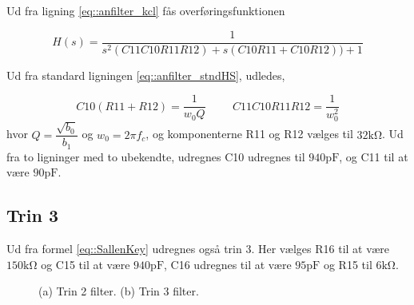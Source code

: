 Ud fra ligning \ref{eq::anfilter_kcl} fås overføringsfunktionen


\begin{equation}
H(s) = \dfrac{1}{s^2(C11C10R11R12)+s(C10R11+C10R12))+1}
\label{eq::SallenKey}
\end{equation}
 
Ud fra standard ligningen \ref{eq::anfilter_stndHS}, udledes,

\begin{equation}
	 C10(R11+R12) = \dfrac{1}{w_0 Q} \hspace{1cm} C11  C10  R11  R12 = \dfrac{1}{w_0^2} \nonumber
\end{equation}
hvor $Q = \dfrac{\sqrt{b_0}}{b_1}$ og $w_0 = 2\pi f_c$, og komponenterne R11 og R12 vælges til $32\si{\kilo\ohm}$. Ud fra to ligninger med to ubekendte, udregnes C10 udregnes til $940\si{\pico\farad}$, og C11 til at være $90 \si{\pico\farad}$.
\subsection{Trin 3}
Ud fra formel \ref{eq::SallenKey} udregnes også trin 3. Her vælges R16 til at være $150\si{\kilo\ohm}$ og C15 til at være $940\si{\pico\farad}$, C16 udregnes til at være $95\si{\pico\farad}$ og R15 til $6 \si{\kilo\ohm} $. 

\begin{figure}[h]
	\centering
	\caption{(a) Trin 2 filter. (b) Trin 3 filter.}
\end{figure}
\FloatBlock

